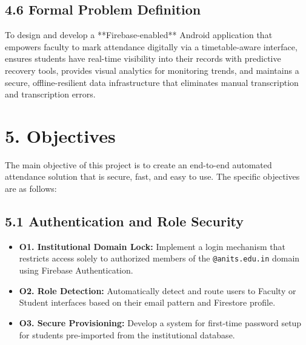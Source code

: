 \documentclass[12pt,a4paper]{report}
\begin{document}
\section*{4.6 Formal Problem Definition}
\begin{tcolorbox}[enhanced, colback=blue!4, colframe=anitsblue, title=Problem Statement Definition, fonttitle=\bfseries]
To design and develop a **Firebase-enabled** Android application that empowers faculty to mark attendance digitally via a timetable-aware interface, ensures students have real-time visibility into their records with predictive recovery tools, provides visual analytics for monitoring trends, and maintains a secure, offline-resilient data infrastructure that eliminates manual transcription and transcription errors.
\end{tcolorbox}

\chapter*{5. Objectives}

The main objective of this project is to create an end-to-end automated attendance solution that is secure, fast, and easy to use. The specific objectives are as follows:

\section*{5.1 Authentication and Role Security}
\begin{itemize}[leftmargin=*, label=\checkmark]
    \item \textbf{O1. Institutional Domain Lock:} Implement a login mechanism that restricts access solely to authorized members of the \texttt{@anits.edu.in} domain using Firebase Authentication.
    \item \textbf{O2. Role Detection:} Automatically detect and route users to Faculty or Student interfaces based on their email pattern and Firestore profile.
    \item \textbf{O3. Secure Provisioning:} Develop a system for first-time password setup for students pre-imported from the institutional database.
\end{itemize}
\end{document}
